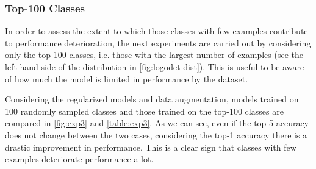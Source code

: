 \subsubsection{Top-100 Classes}
\label{sec:cil-top100}
In order to assess the extent to which those classes with few examples contribute to performance deterioration, the next experiments are carried out by considering only the top-100 classes, i.e. those with the largest number of examples (see the left-hand side of the distribution in \autoref{fig:logodet-dist}). This is useful to be aware of how much the model is limited in performance by the dataset.

Considering the regularized models and data augmentation, models trained on 100 randomly sampled classes and those trained on the top-100 classes are compared in \autoref{fig:exp3} and \autoref{table:exp3}. As we can see, even if the top-5 accuracy does not change between the two cases, considering the top-1 accuracy there is a drastic improvement in performance. This is a clear sign that classes with few examples deteriorate performance a lot.

